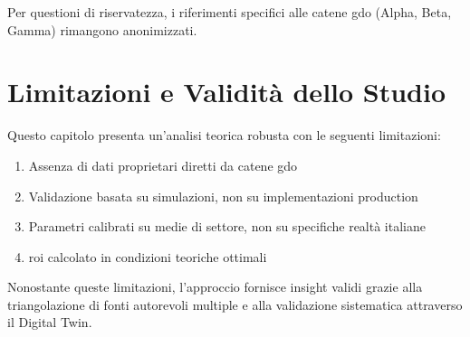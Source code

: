 Per questioni di riservatezza, i riferimenti specifici alle catene 
\gls{gdo} (Alpha, Beta, Gamma) rimangono anonimizzati.



\section{\texorpdfstring{Limitazioni e Validità dello Studio}{2.8 - Limitazioni e Validità dello Studio}}

Questo capitolo presenta un'analisi teorica robusta con le seguenti limitazioni:
\begin{enumerate}
    \item Assenza di dati proprietari diretti da catene \gls{gdo}
    \item Validazione basata su simulazioni, non su implementazioni production
    \item Parametri calibrati su medie di settore, non su specifiche realtà italiane
    \item \gls{roi} calcolato in condizioni teoriche ottimali
\end{enumerate}

Nonostante queste limitazioni, l'approccio fornisce insight validi 
grazie alla triangolazione di fonti autorevoli multiple e alla 
validazione sistematica attraverso il Digital Twin.


